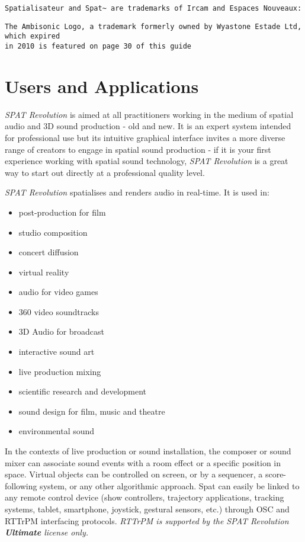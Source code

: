 \documentclass[
  letterpaper,
  DIV=11,
  numbers=noendperiod]{scrreport}
\providecommand{\tightlist}{%
  \setlength{\itemsep}{0pt}\setlength{\parskip}{0pt}}\usepackage{longtable,booktabs,array}
\begin{document}
\texttt{Spatialisateur\ and\ Spat\textasciitilde{}\ are\ trademarks\ of\ Ircam\ and\ Espaces\ Nouveaux:}

\begin{verbatim}
The Ambisonic Logo, a trademark formerly owned by Wyastone Estade Ltd, which expired
in 2010 is featured on page 30 of this guide
\end{verbatim}


\hypertarget{users-and-applications}{%
\chapter{Users and Applications}\label{users-and-applications}}

\emph{SPAT Revolution} is aimed at all practitioners working in the
medium of spatial audio and 3D sound production - old and new. It is an
expert system intended for professional use but its intuitive graphical
interface invites a more diverse range of creators to engage in spatial
sound production - if it is your first experience working with spatial
sound technology, \emph{SPAT Revolution} is a great way to start out
directly at a professional quality level.

\emph{SPAT Revolution} spatialises and renders audio in real-time. It is
used in:

\begin{itemize}
\tightlist
\item
  post-production for film
\item
  studio composition
\item
  concert diffusion
\item
  virtual reality
\item
  audio for video games
\item
  360 video soundtracks
\item
  3D Audio for broadcast
\item
  interactive sound art
\item
  live production mixing
\item
  scientific research and development
\item
  sound design for film, music and theatre
\item
  environmental sound
\end{itemize}

In the contexts of live production or sound installation, the composer
or sound mixer can associate sound events with a room effect or a
specific position in space. Virtual objects can be controlled on screen,
or by a sequencer, a score-following system, or any other algorithmic
approach. Spat can easily be linked to any remote control device (show
controllers, trajectory applications, tracking systems, tablet,
smartphone, joystick, gestural sensors, etc.) through OSC and RTTrPM
interfacing protocols. \emph{RTTrPM is supported by the \emph{SPAT
Revolution} \textbf{Ultimate} license only.}
\end{document}
